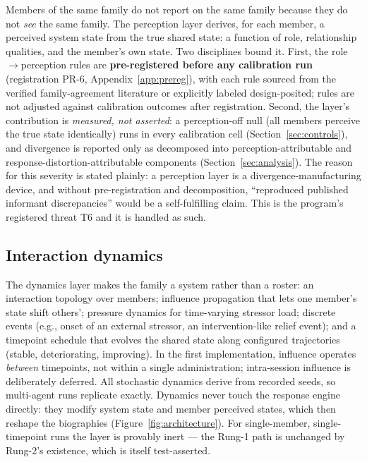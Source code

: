 \documentclass[12pt, letterpaper]{article}
\begin{document}
Members of the same family do not report on the same family because they do not \emph{see} the same family. The perception layer derives, for each member, a perceived system state from the true shared state: a function of role, relationship qualities, and the member's own state. Two disciplines bound it. First, the role$\to$perception rules are \textbf{pre-registered before any calibration run} (registration PR-6, Appendix~\ref{app:prereg}), with each rule sourced from the verified family-agreement literature or explicitly labeled design-posited; rules are not adjusted against calibration outcomes after registration. Second, the layer's contribution is \emph{measured, not asserted}: a perception-off null (all members perceive the true state identically) runs in every calibration cell (Section~\ref{sec:controls}), and divergence is reported only as decomposed into perception-attributable and response-distortion-attributable components (Section~\ref{sec:analysis}). The reason for this severity is stated plainly: a perception layer is a divergence-manufacturing device, and without pre-registration and decomposition, ``reproduced published informant discrepancies'' would be a self-fulfilling claim. This is the program's registered threat T6 and it is handled as such.

\subsection{Interaction dynamics}
\label{sec:dynamics}

The dynamics layer makes the family a system rather than a roster: an interaction topology over members; influence propagation that lets one member's state shift others'; pressure dynamics for time-varying stressor load; discrete events (e.g., onset of an external stressor, an intervention-like relief event); and a timepoint schedule that evolves the shared state along configured trajectories (stable, deteriorating, improving). In the first implementation, influence operates \emph{between} timepoints, not within a single administration; intra-session influence is deliberately deferred. All stochastic dynamics derive from recorded seeds, so multi-agent runs replicate exactly. Dynamics never touch the response engine directly: they modify system state and member perceived states, which then reshape the biographies (Figure~\ref{fig:architecture}). For single-member, single-timepoint runs the layer is provably inert --- the Rung-1 path is unchanged by Rung-2's existence, which is itself test-asserted.
\end{document}
